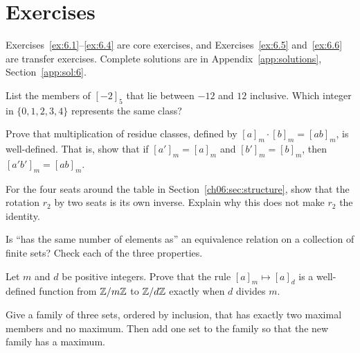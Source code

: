 \section*{Exercises}
Exercises~\ref{ex:6.1}--\ref{ex:6.4} are core exercises, and Exercises~\ref{ex:6.5} and~\ref{ex:6.6} are transfer exercises. Complete solutions are in Appendix~\ref{app:solutions}, Section~\ref{app:sol:6}.
\begin{exercise}\label{ex:6.1}List the members of $[-2]_5$ that lie between $-12$ and $12$ inclusive. Which integer in $\{0,1,2,3,4\}$ represents the same class?\end{exercise}
\begin{exercise}\label{ex:6.2}Prove that multiplication of residue classes, defined by $[a]_m\cdot[b]_m=[ab]_m$, is well-defined. That is, show that if $[a']_m=[a]_m$ and $[b']_m=[b]_m$, then $[a'b']_m=[ab]_m$.\end{exercise}
\begin{exercise}\label{ex:6.3}For the four seats around the table in Section~\ref{ch06:sec:structure}, show that the rotation $r_2$ by two seats is its own inverse. Explain why this does not make $r_2$ the identity.\end{exercise}
\begin{exercise}\label{ex:6.4}Is ``has the same number of elements as'' an equivalence relation on a collection of finite sets? Check each of the three properties.\end{exercise}
\begin{exercise}\label{ex:6.5}Let $m$ and $d$ be positive integers. Prove that the rule $[a]_m\mapsto[a]_d$ is a well-defined function from $\mathbb Z/m\mathbb Z$ to $\mathbb Z/d\mathbb Z$ exactly when $d$ divides $m$.\end{exercise}
\begin{exercise}\label{ex:6.6}Give a family of three sets, ordered by inclusion, that has exactly two maximal members and no maximum. Then add one set to the family so that the new family has a maximum.\end{exercise}
